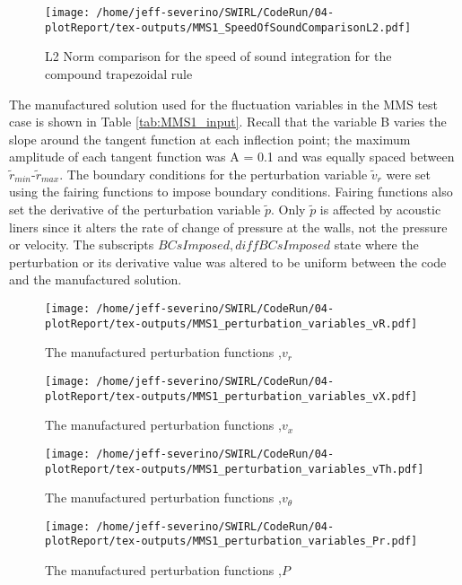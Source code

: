 \begin{figure}[h!]
    \centering
    \texttt{[image: /home/jeff-severino/SWIRL/CodeRun/04-plotReport/tex-outputs/MMS1\_SpeedOfSoundComparisonL2.pdf]}
    \caption{L2 Norm comparison for the speed of sound integration for the compound trapezoidal rule}
    \label{fig:8}
\end{figure}

The manufactured solution used for the fluctuation variables in the MMS test case
is shown in Table \ref{tab:MMS1_input}. Recall that the variable B varies the slope around the
tangent function at each inflection point; the maximum amplitude of each tangent
function was A = 0.1 and was equally spaced between $\tilde{r}_{min}$-$\tilde{r}_{max}$.  
The boundary conditions for the perturbation variable $\tilde{v}_r$ were set 
using the fairing functions to impose boundary conditions. Fairing functions 
also set the derivative of the perturbation variable $\tilde{p}$. Only $\tilde{p}$
is affected by acoustic liners since it alters the rate of change of pressure at 
the walls, not the pressure or velocity. The subscripts $BCsImposed, diffBCsImposed$
state where the perturbation or its derivative value was altered to be uniform between the code and
the manufactured solution.


\begin{figure}[h!]
    \centering
    \texttt{[image: /home/jeff-severino/SWIRL/CodeRun/04-plotReport/tex-outputs/MMS1\_perturbation\_variables\_vR.pdf]}
\caption{The manufactured perturbation functions ,$v_r$}%
    \label{fig:1a}
\end{figure}


\begin{figure}[h!]
    \centering
    \texttt{[image: /home/jeff-severino/SWIRL/CodeRun/04-plotReport/tex-outputs/MMS1\_perturbation\_variables\_vX.pdf]}
\caption{The manufactured perturbation functions ,$v_x$}%
    \label{fig:2a}
\end{figure}


\begin{figure}[h!]
    \centering
    \texttt{[image: /home/jeff-severino/SWIRL/CodeRun/04-plotReport/tex-outputs/MMS1\_perturbation\_variables\_vTh.pdf]}
    \caption{The manufactured perturbation functions ,$v_{\theta}$}%
    \label{fig:3a}
\end{figure}


\begin{figure}[h!]
    \centering
    \texttt{[image: /home/jeff-severino/SWIRL/CodeRun/04-plotReport/tex-outputs/MMS1\_perturbation\_variables\_Pr.pdf]}
\caption{The manufactured perturbation functions ,$P$}%
    \label{fig:4a}
\end{figure}



